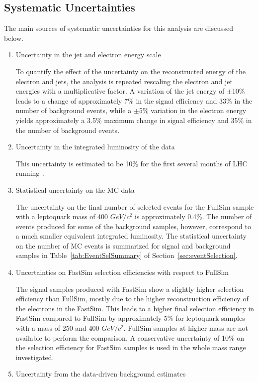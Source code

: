 \documentclass{cmspaper}
\begin{document}
\begin{linenumbers}
\section{Systematic Uncertainties} \label{sec:Systematics}

The main sources of systematic uncertainties for this analysis are discussed below.

%
\begin{enumerate}
\item Uncertainty in the jet and electron energy scale

To quantify the effect of the uncertainty on the reconstructed energy of the electron and jets,
the analysis is repeated rescaling the electron and jet energies
 with a multiplicative factor. 
A variation of the jet energy of $\pm$10\% leads to a change of approximately 
7\% in the signal efficiency and 33\% in the number of background events, 
while a $\pm$5\% variation in the electron energy yields approximately a 3.5\% maximum 
change in signal efficiency and 35\% in the number of background events. 
%
\item Uncertainty in the integrated luminosity of the data

This uncertainty is estimated to be 10\% for the first several months of LHC running~\cite{PTDR}. 
%
\item Statistical uncertainty on the MC data

The uncertainty on the final number of selected events for the FullSim sample with a leptoquark mass of 400 $GeV/c^2$ is 
approximately 0.4\%.  The number of events produced 
for some of the background samples, however, correspond to a much
smaller equivalent integrated luminosity.  
The statistical uncertainty on the number of MC events is summarized for signal and background samples 
in Table~\ref{tab:EventSelSummary} of Section~\ref{sec:eventSelection}.  
%
\item Uncertainties on FastSim selection efficiencies with respect to FullSim

The signal samples produced with FastSim show a slightly higher selection efficiency than FullSim, 
mostly due to the higher reconstruction efficiency of the electrons in the FastSim. 
This leads to a higher final selection efficiency in FastSim compared to FullSim by approximately 5\% 
for leptoquark samples with a mass of 250 and 400 $GeV/c^2$. FullSim samples at higher mass are not available 
to perform the comparison. A conservative uncertainty of 10\% on the selection efficiency 
for FastSim samples is used in the whole mass range investigated. 
%
\item Uncertainty from the data-driven background estimates


\end{enumerate}
\end{linenumbers}
\end{document}
